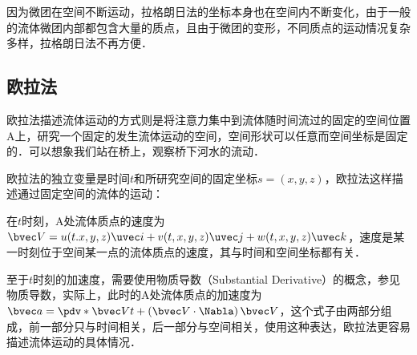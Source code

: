 因为微团在空间不断运动，拉格朗日法的坐标本身也在空间内不断变化，由于一般的流体微团内部都包含大量的质点，且由于微团的变形，不同质点的运动情况复杂多样，拉格朗日法不再方便．

\subsection{欧拉法}
欧拉法描述流体运动的方式则是将注意力集中到流体随时间流过的固定的空间位置A上，研究一个固定的发生流体运动的空间，空间形状可以任意而空间坐标是固定的．可以想象我们站在桥上，观察桥下河水的流动．

欧拉法的独立变量是时间$t$和所研究空间的固定坐标$s=(x,y,z)$，欧拉法这样描述通过固定空间的流体的运动：

在$t$时刻，A处流体质点的速度为$\bvec V=u(t.x,y,z)\uvec i+v(t,x,y,z)\uvec j+w(t,x,y,z)\uvec k$，速度是某一时刻位于空间某一点的流体质点的速度，其与时间和空间坐标都有关．

至于$t$时刻的加速度，需要使用物质导数（Substantial  Derivative）的概念，参见物质导数，实际上，此时的A处流体质点的加速度为$\bvec a=\pdv*{\bvec V}{t}+\left ( \bvec V\cdot \Nabla \right )\bvec V$，这个式子由两部分组成，前一部分只与时间相关，后一部分与空间相关，使用这种表达，欧拉法更容易描述流体运动的具体情况．
